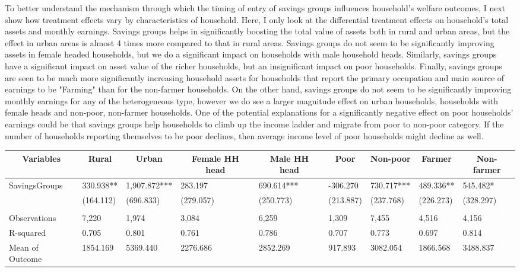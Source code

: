 \documentclass[12pt]{article}
\begin{document}
{\hspace{1cm} To better understand the mechanism
through which the timing of entry of savings groups influences household's welfare outcomes, I next show how treatment effects vary by characteristics of household. Here, I only look at the differential treatment effects on household's total assets and monthly earnings. Savings groups helps in significantly boosting the total value of assets both in rural and urban areas, but the effect in urban areas is almost 4 times more compared to that in rural areas. Savings groups do not seem to be significantly improving assets in female headed households, but we do a significant impact on households with male household heads. Similarly, savings groups have a significant impact on asset value of the richer households, but an insignificant impact on poor households. Finally, savings groups are seen to be much more significantly increasing household assets for households that report the primary occupation and main source of earnings to be "Farming" than for the non-farmer households. On the other hand, savings groups do not seem to be significantly improving monthly earnings for any of the heterogeneous type, however we do see a larger magnitude effect on urban households, households with female heads and non-poor, non-farmer households. One of the potential explanations for a significantly negative effect on poor households' earnings could be that savings groups help households to climb up the income ladder and migrate from poor to non-poor category. If the number of households reporting themselves to be poor declines, then average income level of poor households might decline as well. 


\begin{table}
\centering
\begin{tabular}{lllllllll}
 \\
\cline{1-9}
\multicolumn{1}{c}{\bfseries  Variables} & \multicolumn{1}{c}{\bfseries  Rural} &  \multicolumn{1}{c}{\bfseries  Urban} & \multicolumn{1}{c}{\bfseries  Female HH head} &  \multicolumn{1}{c}{\bfseries  Male HH head} & \multicolumn{1}{c}{\bfseries  Poor} &  \multicolumn{1}{c}{\bfseries  Non-poor} & \multicolumn{1}{c}{\bfseries  Farmer} &  \multicolumn{1}{c}{\bfseries  Non-farmer}\\
\hline
SavingsGroups  & 330.938**	& 1,907.872***	& 283.197	& 690.614*** &	-306.270 &	730.717***	& 489.336** &	545.482*
 \\
 & (164.112) &	(696.833) &	(279.057)	& (250.773)	& (213.887) &	(237.768) &	(226.273) &	(328.297)
 \\
 &  \\
Observations & 7,220	& 1,974	& 3,084	& 6,259 &	1,309 & 	7,455 &	4,516 & 4,156 \\
R-squared & 0.705 &	0.801 &	0.761 &	0.786 &	0.707 &	0.773	& 0.697 &	0.814 \\
Mean of Outcome & 1854.169	& 5369.440	& 2276.686 &	2852.269	& 917.893	& 3082.054 &	1866.568 &	3488.837


\end{tabular}
\end{table}}
\end{document}
